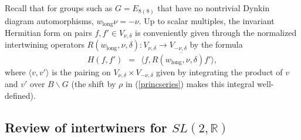 \documentclass[12pt]{article}
\numberwithin{equation}{section}
\newcommand{\R}{{\mathbb{R}}}
\renewcommand\({\left(}
\renewcommand\){\right)}
\begin{document}
Recall that for groups such as  $G=E_{8(8)}$ that have no nontrivial Dynkin diagram automorphisms, $w_\text{long}\nu=-\nu$.
Up to scalar multiples, the invariant Hermitian form on pairs $f,f'\in V_{\nu,\delta}$ is conveniently given through the normalized intertwining operators $R(w_{\text{long}},\nu,\delta):V_{\nu,\delta}\rightarrow V_{-\nu,\delta}$ by the formula
\begin{equation}\label{hermitianform}
  H(f,f') \ \ = \ \ \langle f,\overline{R(w_{\text{long}},\nu,\delta)f'}\rangle,
\end{equation}
where $\langle v,v'\rangle$ is the pairing on $V_{\nu,\delta}\times V_{-\nu,\delta}$ given by integrating the product of $v$ and $v'$ over $B\backslash G$ (the shift by $\rho$ in (\ref{princseries}) makes this integral well-defined).



\subsection{Review of intertwiners for $SL(2,\R)$}\label{sec:sub:SL2intertwiners}
\end{document}
